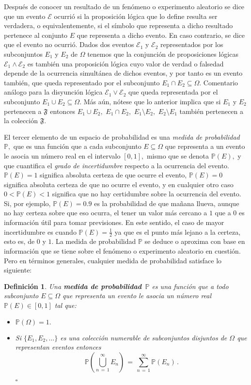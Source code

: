 \documentclass[spanish,10pt,letterpaper]{article}
\newtheorem{defi}{Definición}
\newcommand{\prob}{\mathbb{P}}
\newcommand{\qed}{\begin{flushright}$\square$\end{flushright}}
\begin{document}
		
	Después de conocer un resultado de un fenómeno o experimento aleatorio se dice que un evento $\mathcal{E}$ ocurrió si la proposición lógica que lo define resulta ser verdadera, o equivalentemente, si el símbolo que representa a dicho resultado pertenece al conjunto $E$ que representa a dicho evento. En caso contrario, se dice que el evento no ocurrió. Dados dos eventos $\mathcal{E}_1$ y $\mathcal{E}_2$ representados por los subconjuntos $E_1$ y $E_2$ de $\Omega$ tenemos que la conjunción de proposiciones lógicas $\mathcal{E}_1\wedge\mathcal{E}_2$ es también una proposición lógica cuyo valor de verdad o falsedad depende de la ocurrencia simultánea de dichos eventos, y por tanto es un evento también, que queda representado por el subconjunto $E_1\cap E_2\subseteq\Omega.$ Comentario análogo para la disyunción lógica $\mathcal{E}_1\vee\mathcal{E}_2$ que queda representada por el subconjunto $E_1\cup E_2\subseteq\Omega.$ Más aún, nótese que lo anterior implica que si $E_1$ y $E_2$ pertenecen a $\mathfrak{F}$ entonces $E_1\cup E_2,$ $E_1\cap E_2,$ $E_1\setminus E_2,$ $E_2\setminus E_1$ también pertenecen a la colección $\mathfrak{F}.$
	
	\medskip 
	
	El tercer elemento de un espacio de probabilidad es una \textit{medida de probabilidad} $\prob,$ que es una función que a cada subconjunto $E\subseteq\Omega$ que representa a un evento le asocia un número real en el intervalo $[0,1],$ mismo que se denota $\prob(E),$ y que cuantifica el \textit{grado de incertidumbre} respecto a la ocurrencia del evento. $\prob(E)=1$ significa absoluta certeza de que ocurre el evento, $\prob(E)=0$ significa absoluta certeza de que no ocurre el evento, y en cualquier otro caso $0<\prob(E)<1$ significa que no hay certidumbre sobre la ocurrencia del evento. Si, por ejemplo, $\prob(E)=0{.}9$ es la probabilidad de que mañana llueva, aunque no hay certeza sobre que eso ocurra, el tener un valor más cercano a $1$ que a $0$ es información útil para tomar previsiones. En este sentido, el caso de mayor incertidumbre es cuando $\prob(E)=\frac{1}{2}$ ya que es el punto más lejano a la certeza, esto es, de $0$ y $1.$ La medida de probabilidad $\prob$ se deduce o aproxima con base en información que se tiene sobre el fenómeno o experimento aleatorio en cuestión. Pero en términos generales, cualquier medida de probabilidad satisface lo siguiente:
	
	\bigskip 
	
	\begin{defi} \label{def:medidaprob}
		Una \textbf{medida de probabilidad} $\,\prob$ es una función que a todo subconjunto $E\subseteq\Omega$ que representa un evento le asocia un número real $\prob(E)\in[0,1]$ tal que:
		\begin{itemize}
			\item[a)] $\prob(\Omega)=1.$
			\item[b)] Si $\{E_1,E_2,\ldots\}$ es una colección numerable de subconjuntos disjuntos de $\Omega$ que representan eventos entonces $$\prob\left(\bigcup_{n\,=\,1}^{\infty}E_n\right) \,=\, \sum_{n\,=\,1}^{\infty}\prob(E_n)\,.$$ \qed	
		\end{itemize}
	\end{defi} 
		
\end{document}
